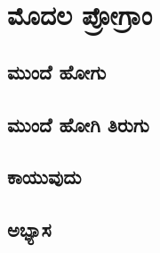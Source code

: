 \chapter{ಮೊದಲ ಪ್ರೋಗ್ರಾಂ}
\SampleProgram


\section{ಮುಂದೆ ಹೋಗು}

\section{ಮುಂದೆ ಹೋಗಿ ತಿರುಗು}

\section{ಕಾಯುವುದು}

\section{ಅಭ್ಯಾಸ }